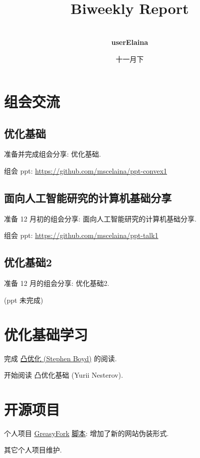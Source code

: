 \documentclass[a4paper]{article}
\title{
    \vspace*{1.0in}
     \\
    \vspace*{1in}
    \textbf{\Huge Biweekly Report}
    \vspace{0.5in}
}
\author{ \\
    \textbf{\huge userElaina} \\
    \vspace*{1in}
}
\date{\LARGE 十一月下}
\begin{document}
\LARGE

\maketitle
\tableofcontents
\thispagestyle{empty}
\newpage

\section{组会交流}

\subsection{优化基础}

准备并完成组会分享: 优化基础.

组会 ppt: \href{convex1}{https://github.com/mscelaina/ppt-convex1}

\subsection{面向人工智能研究的计算机基础分享}

准备 12 月初的组会分享: 面向人工智能研究的计算机基础分享.

组会 ppt: \href{convex1}{https://github.com/mscelaina/ppt-talk1}

\subsection{优化基础2}

准备 12 月的组会分享: 优化基础2.

(ppt 未完成)

\section{优化基础学习}

完成 \href{https://github.com/Honei/bookshelf/blob/master/Math/%E5%87%B8%E4%BC%98%E5%8C%96_Stephen_Boyd(%E7%8E%8B%E4%B9%A6%E5%AE%81%E7%BF%BB%E8%AF%91).pdf}{凸优化 (Stephen Boyd)} 的阅读.

开始阅读 凸优化基础 (Yurii Nesterov).

\section{开源项目}

个人项目 \href{https://greasyfork.org/zh-CN/scripts/461427-%E5%9B%BD%E9%99%85%E7%BD%91%E7%AB%99-%E4%BC%AA%E8%A3%85%E6%88%90-%E5%9B%BD%E5%86%85%E7%BD%91%E7%AB%99-%E6%B1%87%E6%80%BB}{GreasyFork} \href{https://github.com/userElaina/this-is-the-China-website}{脚本}: 增加了新的网站伪装形式.

其它个人项目维护.
\end{document}
